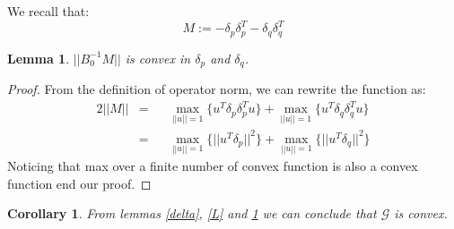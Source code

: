 \documentclass[11pt,twocolumn,varwidth=true,a4paper,fleqn]{article}
\newtheorem{lemma}{Lemma}
\newtheorem{corollary}{Corollary}
\begin{document}
We recall that:
\begin{equation*} 
M:= - \delta_p\delta_p^T - \delta_q\delta_q^T
\end{equation*}
\begin{lemma} \label{M}
$||B_0^{-1}M||$ is convex in $\delta_p$
and $\delta_q$.
\end{lemma}
\begin{proof}
From the definition of operator norm, we can rewrite the function as:
\begin{alignat*} {2}
||M|| & = && \max_{||u||=1}{\{u^T \delta_p\delta_p^T u\}} + \max_{||u||=1}{\{u^T \delta_q\delta_q^T u\}} \\
& = && \max_{||u||=1}{\{||u^T \delta_p||^2\}} + \max_{||u||=1}{\{||u^T
\delta_q||^2\}}
\end{alignat*}
Noticing that max over a finite number of convex function is also a convex
function end our proof.
\end{proof}

\begin{corollary}
From lemmas \ref{delta}, \ref{L} and \ref{M} we can conclude that $\mathcal{G}$
is convex.
\end{corollary}
\end{document}
